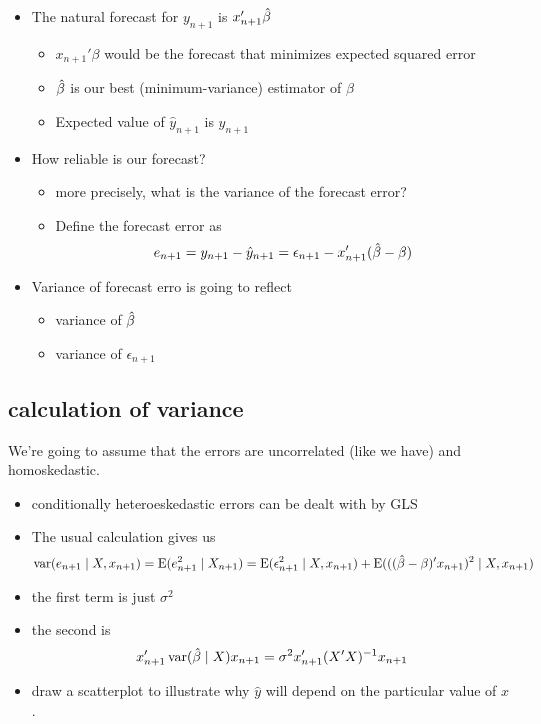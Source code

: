 \begin{itemize}[leftmargin=0pt]
\item The natural forecast for $y_{n+1}$ is $x_{n+1}'\hat{\beta}$
\begin{itemize}
\item $x_{n+1}'\beta$ would be the forecast that minimizes expected
         squared error
\item $\hat{\beta}$ is our best (minimum-variance) estimator of $\beta$
\item Expected value of $\hat y_{n+1}$ is $y_{n+1}$
\end{itemize}
\item How reliable is our forecast?
\begin{itemize}
\item more precisely, what is the variance of the forecast error?
\item Define the forecast error as 
  \[ e_{n+1} = y_{n+1} - \hat y_{n+1} = \epsilon_{n+1} - x_{n+1}'(\hat{\beta} - \beta) \]
\end{itemize}
\item Variance of forecast erro is going to reflect
\begin{itemize}
\item variance of $\hat{\beta}$
\item variance of $\epsilon_{n+1}$
\end{itemize}
\end{itemize}

\subsection{calculation of variance}

     We're going to assume that the errors are uncorrelated (like we
     have) and homoskedastic.
\begin{itemize}[leftmargin=0pt]
\item conditionally heteroeskedastic errors can be dealt with by GLS
\item The usual calculation gives us
  \[ \operatorname{var}(e_{n+1} \mid X, x_{n+1}) = \operatorname{E}(e_{n+1}^2 \mid X_{n+1}) = \operatorname{E}(\epsilon_{n+1}^2
  \mid X, x_{n+1}) + \operatorname{E}(((\hat{\beta} - \beta)'x_{n+1})^2 \mid X, x_{n+1})\]
\item the first term is just $\sigma^2$
\item the second is 
  \[ x_{n+1}' \operatorname{var}(\hat{\beta} \mid X) x_{n+1} = \sigma^2 x_{n+1}'(X'X)^{-1}x_{n+1}\]
\item draw a scatterplot to illustrate why $\hat y$ will depend on
       the particular value of $x$.
\end{itemize}

